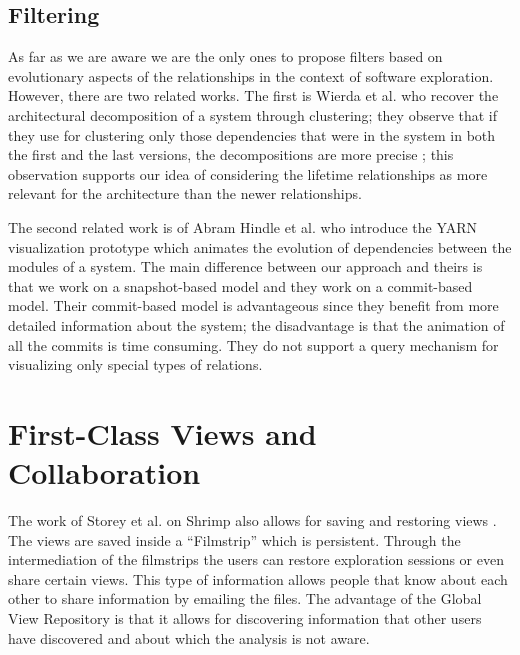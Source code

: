 \documentclass[preprint,12pt]{elsarticle}
\begin{document}
\subsection {Filtering}
 

As far as we are aware we are the only ones to propose filters based on evolutionary aspects of the relationships in the context of software exploration. However, there are two related works. The first is Wierda et al. who recover the architectural decomposition of a system through clustering; they observe that if they use for clustering only those dependencies that were in the system in both the first and the last versions, the decompositions are more precise \cite{wierda-clustering}; this observation supports our idea of considering the lifetime relationships as more relevant for the architecture than the newer relationships. 

The second related work is of Abram Hindle et al. \cite{hindle-yarn} who introduce the YARN visualization prototype which animates the evolution of dependencies between the modules of a system. The main difference between our approach and theirs is that we work on a snapshot-based model and they work on a commit-based model. Their commit-based model is advantageous since they benefit from more detailed information about the system; the disadvantage is that the animation of all the commits is time consuming. They do not support a query mechanism for visualizing only special types of relations.


\section {First-Class Views and Collaboration} 

The work of Storey et al. on Shrimp also allows for saving and restoring views \cite{rayside-flow}. The views are saved inside a ``Filmstrip'' which is persistent. Through the intermediation of the filmstrips the users can restore exploration sessions or even share certain views. This type of information allows people that know about each other to share information by emailing the files. The advantage of the Global View Repository is that it allows for discovering information that other users have discovered and about which the analysis is not aware. 
\end{document}
